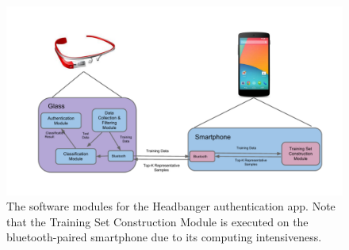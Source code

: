 \begin{figure}[t]
\centering
\includegraphics [width=.85\linewidth]{../fig/sofware_architecture}
\caption{The software modules for the Headbanger authentication app. Note that 
the Training Set Construction Module is executed on the bluetooth-paired 
smartphone due to its computing intensiveness. \label{fig:software_arch}}
\end{figure}

\fi